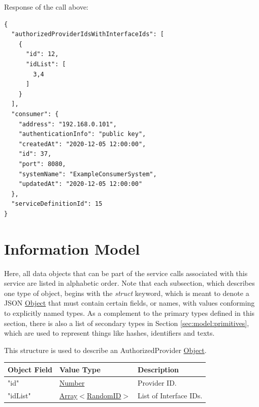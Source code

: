 \documentclass[a4paper]{arrowhead}
\newcommand{\fref}[1]{{\textcolor{ArrowheadBlue}{\hyperref[sec:functions:#1]{#1}}}}
\newcommand{\mref}[1]{{\textcolor{ArrowheadPurple}{\hyperref[sec:model:#1]{#1}}}}
\newcommand{\pref}[1]{{\textcolor{ArrowheadGrey}{\hyperref[sec:model:primitives:#1]{#1}}}}
\begin{document}
Response of the call above:

\begin{lstlisting}[language=http,label={lst:response},caption={A \fref{Check an Intracloud Rule} IntraClouRresponse}]
{
  "authorizedProviderIdsWithInterfaceIds": [
    {
      "id": 12,
      "idList": [
        3,4
      ]
    }
  ],
  "consumer": {
    "address": "192.168.0.101",
    "authenticationInfo": "public key",
    "createdAt": "2020-12-05 12:00:00",
    "id": 37,
    "port": 8080,
    "systemName": "ExampleConsumerSystem",
    "updatedAt": "2020-12-05 12:00:00"
  },
  "serviceDefinitionId": 15
}
\end{lstlisting}

\newpage

\section{Information Model}
\label{sec:model}

Here, all data objects that can be part of the service calls associated with this service are listed in alphabetic order.
Note that each subsection, which describes one type of object, begins with the \textit{struct} keyword, which is meant to denote a JSON \pref{Object} that must contain certain fields, or names, with values conforming to explicitly named types.
As a complement to the primary types defined in this section, there is also a list of secondary types in Section \ref{sec:model:primitives}, which are used to represent things like hashes, identifiers and texts.


This structure is used to describe an AuthorizedProvider \pref{Object}. 

\begin{table}[ht!]
\begin{tabularx}{\textwidth}{| p{5cm} | p{3.5cm} | X |} \hline
\rowcolor{gray!33} Object Field & Value Type      & Description \\ \hline
"id"                   & \pref{Number}     & Provider ID. \\ \hline
"idList"  & \pref{Array}$<$\mref{RandomID}$>$     & List of Interface IDs. \\ \hline

\end{tabularx}
\end{table}

\end{document}
